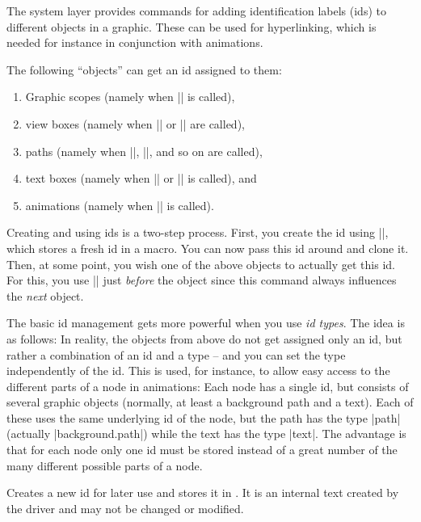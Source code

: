 The system layer provides commands for adding identification labels (ids) to
different objects in a graphic. These can be used for hyperlinking, which is
needed for instance in conjunction with animations.

The following ``objects'' can get an id assigned to them:
%
\begin{enumerate}
    \item Graphic scopes (namely when |\pgfsys@begin@idscope| is called),
    \item view boxes (namely when |\pgfsys@viewboxmeet| or
        |\pgfsys@viewboxslice| are called),
    \item paths (namely when |\pgfsys@fill|, |\pgfsys@stroke|, and so on are
        called),
    \item text boxes (namely when |\pgfsys@hbox| or |\pgfsys@hboxsynced| is
        called), and
    \item animations (namely when |\pgfsys@animate| is called).
\end{enumerate}

Creating and using ids is a two-step process. First, you create the id using
|\pgfsys@new@id|, which stores a fresh id in a macro. You can now pass this id
around and clone it. Then, at some point, you wish one of the above objects to
actually get this id. For this, you use |\pgfsys@use@id| just \emph{before} the
object since this command always influences the \emph{next} object.

The basic id management gets more powerful when you use \emph{id types}. The
idea is as follows: In reality, the objects from above do not get assigned only
an id, but rather a combination of an id and a type -- and you can set the type
independently of the id. This is used, for instance, to allow easy access to
the different parts of a node in animations: Each node has a single id, but
consists of several graphic objects (normally, at least a background path and a
text). Each of these uses the same underlying id of the node, but the path has
the type |path| (actually |background.path|) while the text has the type
|text|. The advantage is that for each node only one id must be stored instead
of a great number of the many different possible parts of a node.

\begin{command}{\pgfsys@new@id{}}
    Creates a new id for later use and stores it in . It is an
    internal text created by the driver and may not be changed or modified.
\end{command}


